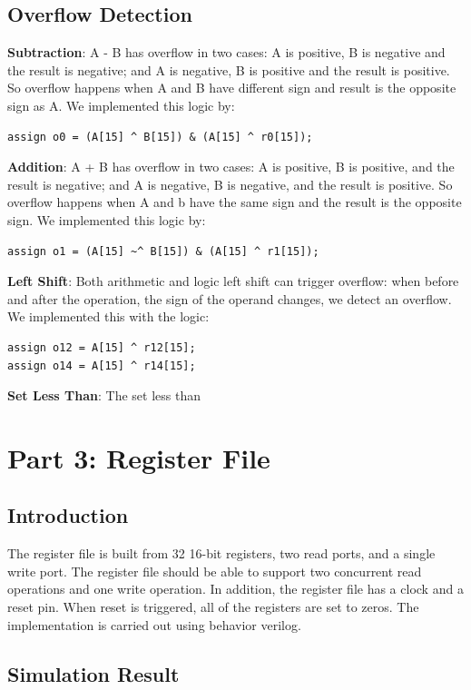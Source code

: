 \documentclass{article}
\begin{document}
\subsection{Overflow Detection}
\textbf{Subtraction}: A - B has overflow in two cases: A is positive, B is negative and the result is negative; and A is negative, B is positive and the result is positive. So overflow happens when A and B have different sign and result is the opposite sign as A. We implemented this logic by: 
\begin{verbatim}
assign o0 = (A[15] ^ B[15]) & (A[15] ^ r0[15]);
\end{verbatim}
\vspace{5mm}
\textbf{Addition}: A + B has overflow in two cases: A is positive, B is positive, and the result is negative; and A is negative, B is negative, and the result is positive. So overflow happens when A and b have the same sign and the result is the opposite sign. We implemented this logic by:
\begin{verbatim}
assign o1 = (A[15] ~^ B[15]) & (A[15] ^ r1[15]);
\end{verbatim}
\vspace{5mm}
\textbf{Left Shift}: 
Both arithmetic and logic left shift can trigger overflow: when before and after the operation, the sign of the operand changes, we detect an overflow. We implemented this with the logic: 
\begin{verbatim}
assign o12 = A[15] ^ r12[15];
assign o14 = A[15] ^ r14[15];
\end{verbatim}
\vspace{5mm}
\textbf{Set Less Than}: The set less than 



\section{Part 3: Register File }
\subsection{Introduction}
The register file is built from 32 16-bit registers, two read ports, and a single write port. The register file should be able to support two concurrent read operations and one write operation. In addition, the register file has a clock and a reset pin. When reset is triggered, all of the registers are set to zeros. The implementation is carried out using behavior verilog. 
\subsection{Simulation Result}
\end{document}
